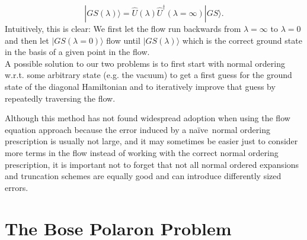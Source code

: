 \begin{equation}
|GS(\lambda)\rangle = \hat U(\lambda)\hat U^\dagger(\lambda=\infty)|GS\rangle.
\end{equation}
Intuitively, this is clear: We first let the flow run backwards from $\lambda=\infty$ to $\lambda = 0$ and then let $|GS(\lambda=0)\rangle$ flow until $|GS(\lambda)\rangle$ which is the correct ground state in the basis of a given point in the flow.\\
A possible solution to our two problems is to first start with normal ordering w.r.t. some arbitrary state (e.g. the vacuum) to get a first guess for the ground state of the diagonal Hamiltonian and to iteratively improve that guess by repeatedly traversing the flow. \par
Although this method has not found widespread adoption when using the flow equation approach because the error induced by a \grqq na\"ive\grqq\  normal ordering prescription is usually not large, and it may sometimes be easier just to consider more terms in the flow instead of working with the correct normal ordering prescription, it is important not to forget that not all normal ordered expansions and truncation schemes are equally good and can introduce differently sized errors.

\section{The Bose Polaron Problem}
